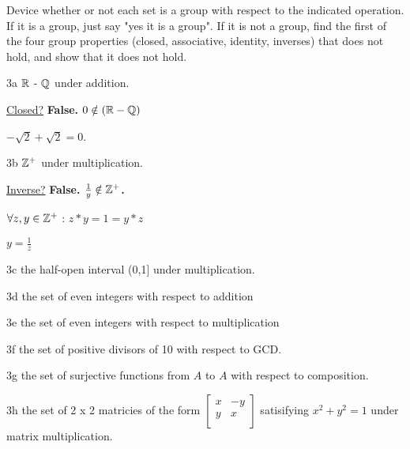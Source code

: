 \begin{question}{3}
Device whether or not each set is a group with respect to the indicated operation. If it is a group, just say "yes it is a group". If it is not a group, find the first of the four group properties (closed, associative, identity, inverses) that does not hold, and show that it does not hold.
\end{question}

\begin{question}{3a}
$\mathbb{R}$ - $\mathbb{Q}$ under addition.
\end{question}

\underline{Closed?} \textbf{False. $0 \notin (\mathbb{R}-\mathbb{Q})$}

$-\sqrt{2} + \sqrt{2} = 0$. 


\begin{question}{3b}
$\mathbb{Z}^+$ under multiplication.
\end{question}

\underline{Inverse?} \textbf{False. $\frac{1}{y} \notin \mathbb{Z}^+$.}

$\forall z,y \in \mathbb{Z}^+$ : $z * y = 1 = y * z$

$y = \frac{1}{z}$



\begin{question}{3c}
the half-open interval (0,1] under multiplication.
\end{question}


\begin{question}{3d}
the set of even integers with respect to addition
\end{question}


\begin{question}{3e}
the set of even integers with respect to multiplication
\end{question}


\begin{question}{3f}
the set of positive divisors of 10 with respect to GCD.
\end{question}


\begin{question}{3g}
the set of surjective functions from $A$ to $A$ with respect to composition.
\end{question}


\begin{question}{3h}
the set of 2 x 2 matricies of the form $\begin{bmatrix}
  x & -y \\
  y & x  \\
 \end{bmatrix}$ satisifying $x^2 + y^2 = 1$ under matrix multiplication.

\end{question}


